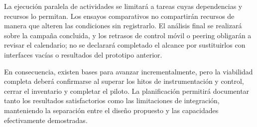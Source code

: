La ejecución paralela de actividades se limitará a tareas cuyas dependencias y recursos lo permitan. Los ensayos comparativos no compartirán recursos de manera que alteren las condiciones sin registrarlo. El análisis final se realizará sobre la campaña concluida, y los retrasos de control móvil o peering obligarán a revisar el calendario; no se declarará completado el alcance por sustituirlos con interfaces vacías o resultados del prototipo anterior.

En consecuencia, existen bases para avanzar incrementalmente, pero la viabilidad completa deberá confirmarse al superar los hitos de instrumentación y control, cerrar el inventario y completar el piloto. La planificación permitirá documentar tanto los resultados satisfactorios como las limitaciones de integración, manteniendo la separación entre el diseño propuesto y las capacidades efectivamente demostradas.

